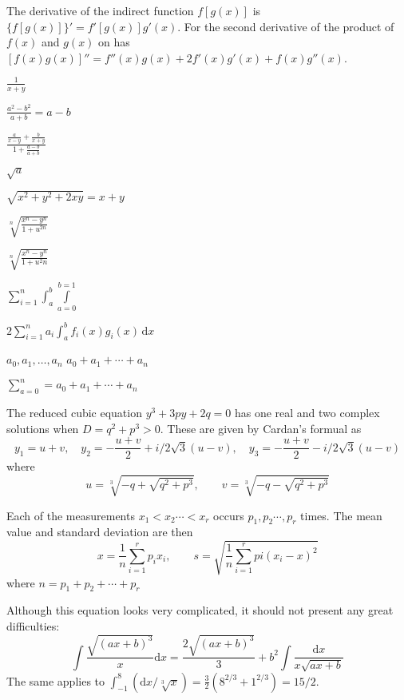\documentclass{article}
\begin{document}
    The derivative of the indirect function $f[g(x)]$ is $\{f[g(x)]\}' = f'[g(x)]g'(x)$.
    For the second derivative of the product of $f(x)$ and $g(x)$ on has $[f(x)g(x)]'' = f''(x)g(x) + 2f'(x)g'(x) + f(x)g''(x)$.
    
    $\frac{1}{x+y}$

    $\frac{a^2 - b^2}{a+b}=a-b$
    
    $\frac{\frac{a}{x-y} + \frac{b}{x+y}}{1+\frac{a-b}{a+b}}$

    $\sqrt{a}$


    $\sqrt{x^2+y^2+2xy}=x+y$

    $\sqrt[n]{\frac{x^n-y^n}{1+u^{2n}}}$

    $\sqrt[n]{\frac{x^n-y^n}{1+u^2n}}$

    $\sum_{i=1}^n \int_a^b \int\limits_{a=0}^{b=1}$


    $2\sum_{i=1}^n a_i \int^b_a f_i(x)g_i(x)\,\mathrm{d}x$

    $a_0,a_1,\ldots,a_n$
    $a_0 + a_1 + \cdots + a_n$

    $\sum_{a=0}^n = a_0 + a_1 + \cdots + a_n$

    The reduced cubic equation $y^3+3py+2q=0$ has one real and two complex solutions
    when $D=q^2+p^3>0$. These are given by Cardan's formual as
    \begin{equation}
        y_1=u+v,\quad y_2=-\frac{u+v}{2} + i/2\sqrt{3}(u-v),\quad y_3=-\frac{u+v}{2} - i/2\sqrt{3}(u-v)
    \end{equation}
    where
    \begin{equation}
        u=\sqrt[3]{-q+\sqrt{q^2+p^3}},\qquad v=\sqrt[3]{-q-\sqrt{q^2+p^3}}
    \end{equation}

    Each of the measurements $x_1<x_2\cdots<x_r$ occurs $p_1,p_2\cdots,p_r$ times.
    The mean value and standard deviation are then
    \begin{equation}
        x=\frac{1}{n}\sum_{i=1}^rp_ix_i,\qquad s=\sqrt{\frac{1}{n}\sum_{i=1}^rpi(x_i-x)^2}
    \end{equation}
    where $n=p_1+p_2+\cdots+p_r$

    Although this equation looks very complicated, it should not present any great difficulties:
    \begin{equation}
        \int\frac{\sqrt{(ax+b)^3}}{x}\mathrm{d}x=\frac{2\sqrt{(ax+b)^3}}{3}+b^2\int\frac{\mathrm{d}x}{x\sqrt{ax+b}}
    \end{equation}
    The same applies to $\int_{-1}^8(\mathrm{d}x/\sqrt[3]{x})=\frac{3}{2}(8^{2/3}+1^{2/3})=15/2$.
\end{document}

